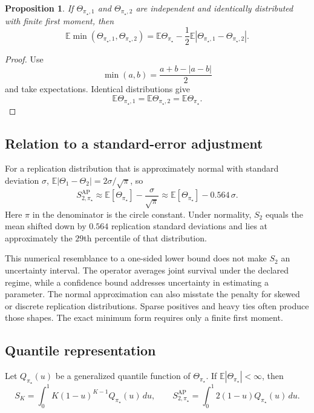 \documentclass[11pt]{article}
\newcommand{\E}{\mathbb{E}}
\newcommand{\SAP}{S_{2,\pi_\star}^{\mathrm{AP}}}
\newtheorem{proposition}{Proposition}
\theoremstyle{remark}
\begin{document}
\begin{proposition}
If $\Theta_{\pi_\star,1}$ and $\Theta_{\pi_\star,2}$ are independent and identically distributed with finite first moment, then
\[
\E\min(\Theta_{\pi_\star,1},\Theta_{\pi_\star,2})
=
\E\Theta_{\pi_\star}
-
\frac12
\E|\Theta_{\pi_\star,1}-\Theta_{\pi_\star,2}|.
\]
\end{proposition}

\begin{proof}
Use
\[
\min(a,b)=\frac{a+b-|a-b|}{2}
\]
and take expectations. Identical distributions give
\[
\E\Theta_{\pi_\star,1}
=
\E\Theta_{\pi_\star,2}
=
\E\Theta_{\pi_\star}.
\]
\end{proof}

\subsection{Relation to a standard-error adjustment}

For a replication distribution that is approximately normal with standard deviation $\sigma$, $\E|\Theta_1-\Theta_2|=2\sigma/\sqrt{\pi}$, so
\begin{equation}
\SAP
\approx
\E[\Theta_{\pi_\star}]-\frac{\sigma}{\sqrt{\pi}}
\approx
\E[\Theta_{\pi_\star}]-0.564\,\sigma .
\label{eq:se-approximation}
\end{equation}
Here $\pi$ in the denominator is the circle constant. Under normality, $S_2$ equals the mean shifted down by $0.564$ replication standard deviations and lies at approximately the $29$th percentile of that distribution.

This numerical resemblance to a one-sided lower bound does not make $S_2$ an uncertainty interval. The operator averages joint survival under the declared regime, while a confidence bound addresses uncertainty in estimating a parameter. The normal approximation can also misstate the penalty for skewed or discrete replication distributions. Sparse positives and heavy ties often produce those shapes. The exact minimum form requires only a finite first moment.

\subsection{Quantile representation}

Let $Q_{\pi_\star}(u)$ be a generalized quantile function of $\Theta_{\pi_\star}$. If $\E|\Theta_{\pi_\star}|<\infty$, then
\begin{equation}
S_K
=
\int_0^1 K(1-u)^{K-1}Q_{\pi_\star}(u)\,du,
\qquad
\SAP
=
\int_0^1 2(1-u)Q_{\pi_\star}(u)\,du.
\label{eq:quantile}
\end{equation}
\end{document}
